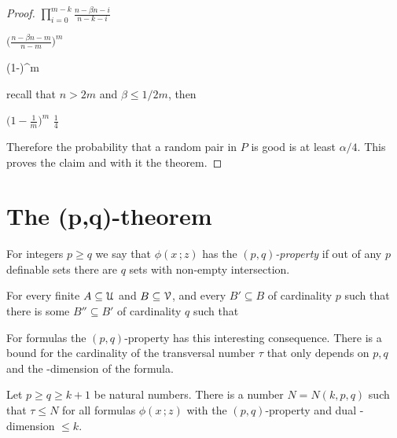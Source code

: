 \documentclass[scombinatorics.tex]{subfiles}
\begin{document}
\begin{proof}
\medrel{\ge}
$\displaystyle\prod^{m-k}_{i=0}\frac{n-\beta n-i}{n-k-i}$

\medrel{\ge}
$\displaystyle\bigg(\frac{n-\beta n-m}{n-m}\bigg)^m$

\ceq{}{=}
{\bigg(1-\bigg)^m}

\smallskip recall that $n>2m$ and $\beta\le1/2m$, then

\medrel{=}
$\displaystyle\bigg(1-\frac{1}{m}\bigg)^m$
\medrel{\ge}
$\displaystyle\frac{1}{4}$

Therefore the probability that a random pair in $P$ is good is at least $\alpha/4$.
This proves the claim and with it the theorem.
\end{proof}


\section{The (p,q)-theorem}

For integers $p\ge q$ we say that $\phi(x\,;z)$ has the \emph{$(p,q)$-property\/} if out of any $p$ definable sets there are $q$ sets with non-empty intersection.

For every finite $A\subseteq\EuScript U$ and $B\subseteq\EuScript V$, and every $B'\subseteq B$ of cardinality $p$ such that there is some $B''\subseteq B'$ of cardinality $q$ such that

{\neq}
{\0}

For {\nip} formulas the $(p,q)$-property has this interesting consequence.
There is a bound for the cardinality of the transversal number $\tau$ that only depends on $p,q$ and the \vc-dimension of the formula.

\begin{theorem}
  Let $p\ge q\ge k+1$ be natural numbers.
  There is a number $N=N(k,p,q)$ such that 
  $\tau\le N$ for all formulas $\phi(x\,;z)$ with the $(p,q)$-property and dual \vc-dimension $\le k$.
\end{theorem}
\end{document}

